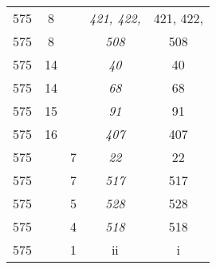 \documentclass[a4paper,11pt]{article}
\begin{document}
\begin{center}
\begin{tabular}{|c|c|c|c|c|}
    575 &  8 & & \emph{421, 422,} & 421, 422, \\
    575 &  8 & & \emph{508} & 508 \\
    575 & 14 & & \emph{40} & 40 \\
    575 & 14 & & \emph{68} & 68 \\
    575 & 15 & & \emph{91} & 91 \\
    575 & 16 & & \emph{407} & 407 \\
    575 & &  7 & \emph{22} & 22 \\
    575 & &  7 & \emph{517} & 517 \\
    575 & &  5 & \emph{528} & 528 \\
    575 & &  4 & \emph{518} & 518 \\
    575 & &  1 & ii & i \\
    \hline
  \end{tabular}



\end{center}
\end{document}
